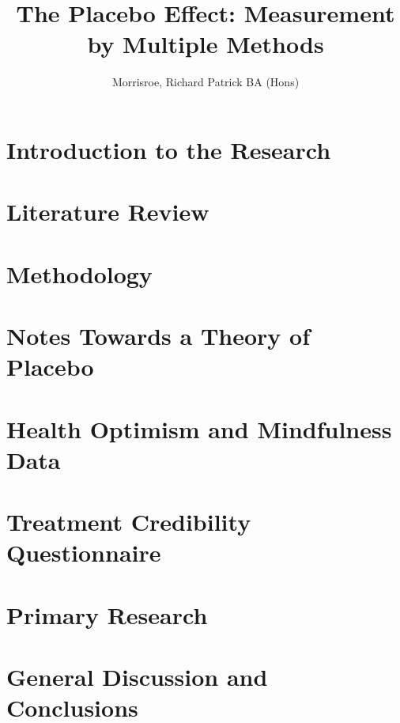 \documentclass[apsych, phd]{uccthesis}
\title{The Placebo Effect: Measurement by Multiple Methods}
\author{Morrisroe, Richard Patrick BA (Hons)}
\begin{document}
\maketitle


\tableofcontents

\chapter{Introduction to the Research}
\label{cha:intr-rese}


\chapter{Literature Review}
\label{cha:literature-review}


\chapter{Methodology}
\label{cha:methodology}



\chapter{Notes Towards a Theory of Placebo}
\label{cha:notes-towards-theory}




\chapter{Health Optimism and Mindfulness Data}
\label{cha:health-for-thesis}


\chapter{Treatment Credibility Questionnaire}
\label{cha:tcq-thesis}


% 

\chapter{Primary Research}
\label{cha:primary-research}


\chapter{General Discussion and Conclusions}
\label{cha:general-discussion}




\end{document}
